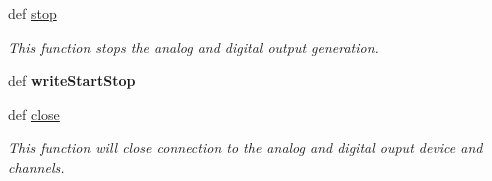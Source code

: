 \begin{DoxyCompactItemize}
def \hyperlink{class_waveform_generator_1_1_waveform_generator_a4e22f830e0cded02a876561c6397de0d}{stop}
\begin{DoxyCompactList}\small\item\em This function stops the analog and digital output generation. \end{DoxyCompactList}\item 
\hypertarget{class_waveform_generator_1_1_waveform_generator_a30ee8b98f7a31f4ed0c28afd72d89930}{def {\bfseries write\-Start\-Stop}}\label{class_waveform_generator_1_1_waveform_generator_a30ee8b98f7a31f4ed0c28afd72d89930}

\item 
def \hyperlink{class_waveform_generator_1_1_waveform_generator_a7bd571409abe468987f15349dc0fa681}{close}
\begin{DoxyCompactList}\small\item\em This function will close connection to the analog and digital ouput device and channels. \end{DoxyCompactList}\end{DoxyCompactItemize}
